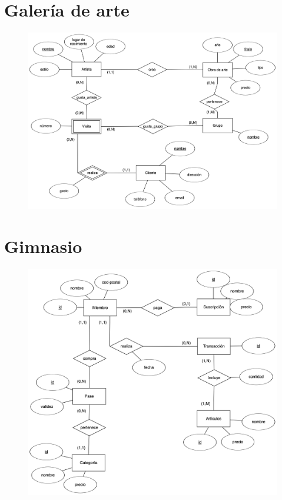 \documentclass[a4paper]{article}
\begin{document}
\section{Galería de arte}
\begin{figure}[H]
    \centering
    \includegraphics[width=\textwidth]{figs/ejercicio-6}
\end{figure}

\section{Gimnasio}
\begin{figure}[H]
    \centering
    \includegraphics[width=\textwidth]{figs/ejercicio-7}
\end{figure}
\end{document}
